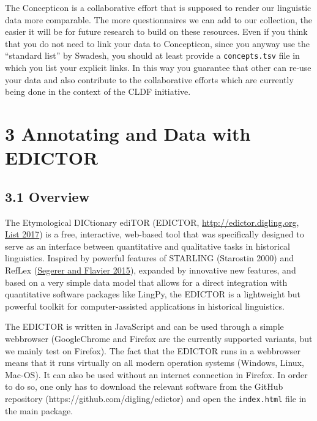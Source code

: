 \documentclass[a4paper,svgnames]{scrartcl}
\begin{document}

The Concepticon is a collaborative effort that is supposed to render our
linguistic data more comparable. The more questionnaires we can add to
our collection, the easier it will be for future research to build on
these resources. Even if you think that you do not need to link your
data to Concepticon, since you anyway use the ``standard list'' by
Swadesh, you should at least provide a \texttt{concepts.tsv} file in
which you list your explicit links. In this way you guarantee that other
can re-use your data and also contribute to the collaborative efforts
which are currently being done in the context of the CLDF initiative.

\section*{3 Annotating and Data with
EDICTOR}\label{annotating-and-data-with-edictor}

\subsection*{3.1 Overview}\label{overview}

The Etymological DICtionary ediTOR (EDICTOR, \url{http://edictor.digling.org},
\href{http://bibliography.lingpy.org?key=List2017d}{List 2017}) is a
free, interactive, web-based tool that was specifically designed to
serve as an interface between quantitative and qualitative tasks in
historical linguistics. Inspired by powerful features of STARLING
(Starostin 2000) and RefLex
(\href{http://bibliography.lingpy.org?key=Segerer2015}{Segerer and
Flavier 2015}), expanded by innovative new features, and based on a very
simple data model that allows for a direct integration with quantitative
software packages like LingPy, the EDICTOR is a lightweight but powerful
toolkit for computer-assisted applications in historical linguistics.

The EDICTOR is written in JavaScript and can be used through a simple
webbrowser (GoogleChrome and Firefox are the currently supported
variants, but we mainly test on Firefox). The fact that the EDICTOR runs
in a webbrowser means that it runs virtually on all modern operation
systems (Windows, Linux, Mac-OS). It can also be used without an
internet connection in Firefox. In order to do so, one only has to
download the relevant software from the GitHub repository
(https://github.com/digling/edictor) and open the \texttt{index.html}
file in the main package.
\end{document}
